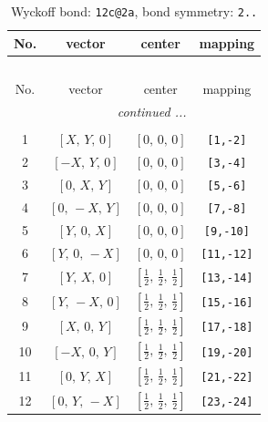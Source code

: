 \documentclass[fleqn,8pt]{jsarticle}
\begin{document}
\begin{longtable}{cccc}
\caption{Wyckoff bond: {\tt 12c@2a}, bond symmetry: {\tt 2..}}
 \\
 \hline \hline
No. & vector & center & mapping \\ \hline \endfirsthead

\multicolumn{3}{l}{\tablename\ \thetable{}} \\
 \hline \hline
No. & vector & center & mapping \\ \hline \endhead

 \hline \hline
\multicolumn{3}{r}{\footnotesize\it continued ...} \\ \endfoot

 \hline \hline
\multicolumn{3}{r}{} \\ \endlastfoot

1 & $\left[ X,\, Y,\, 0 \right]$ & $\left[ 0,\, 0,\, 0 \right]$ & {\tt [1,-2]} \\ \hline
2 & $\left[ - X,\, Y,\, 0 \right]$ & $\left[ 0,\, 0,\, 0 \right]$ & {\tt [3,-4]} \\ \hline
3 & $\left[ 0,\, X,\, Y \right]$ & $\left[ 0,\, 0,\, 0 \right]$ & {\tt [5,-6]} \\ \hline
4 & $\left[ 0,\, - X,\, Y \right]$ & $\left[ 0,\, 0,\, 0 \right]$ & {\tt [7,-8]} \\ \hline
5 & $\left[ Y,\, 0,\, X \right]$ & $\left[ 0,\, 0,\, 0 \right]$ & {\tt [9,-10]} \\ \hline
6 & $\left[ Y,\, 0,\, - X \right]$ & $\left[ 0,\, 0,\, 0 \right]$ & {\tt [11,-12]} \\ \hline
7 & $\left[ Y,\, X,\, 0 \right]$ & $\left[ \frac{1}{2},\, \frac{1}{2},\, \frac{1}{2} \right]$ & {\tt [13,-14]} \\ \hline
8 & $\left[ Y,\, - X,\, 0 \right]$ & $\left[ \frac{1}{2},\, \frac{1}{2},\, \frac{1}{2} \right]$ & {\tt [15,-16]} \\ \hline
9 & $\left[ X,\, 0,\, Y \right]$ & $\left[ \frac{1}{2},\, \frac{1}{2},\, \frac{1}{2} \right]$ & {\tt [17,-18]} \\ \hline
10 & $\left[ - X,\, 0,\, Y \right]$ & $\left[ \frac{1}{2},\, \frac{1}{2},\, \frac{1}{2} \right]$ & {\tt [19,-20]} \\ \hline
11 & $\left[ 0,\, Y,\, X \right]$ & $\left[ \frac{1}{2},\, \frac{1}{2},\, \frac{1}{2} \right]$ & {\tt [21,-22]} \\ \hline
12 & $\left[ 0,\, Y,\, - X \right]$ & $\left[ \frac{1}{2},\, \frac{1}{2},\, \frac{1}{2} \right]$ & {\tt [23,-24]} \\
\end{longtable}
\end{document}
